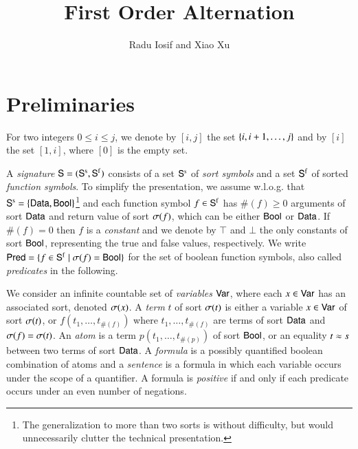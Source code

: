 \documentclass{llncs}
\begin{document}

\title{First Order Alternation}

\author{Radu Iosif and Xiao Xu}

\maketitle

\begin{abstract}
\end{abstract}

\section{Preliminaries}

For two integers $0 \leq i \leq j$, we denote by $[i,j]$ the set
$\{ i,i+1,\ldots,j \}$ and by $[i]$ the set $[1,i]$, where $[0]$ is
the empty set.

A \emph{signature} $\mathsf{S} = (\mathsf{S}^\mathrm{s},\mathsf{S}^\mathrm{f})$ consists of a
set $\mathsf{S}^\mathrm{s}$ of \emph{sort symbols} and a set $\mathsf{S}^\mathrm{f}$ of
sorted \emph{function symbols}. To simplify the presentation, we
assume w.l.o.g. that $\mathsf{S}^\mathrm{s} = \{ \mathsf{Data},\mathsf{Bool} \}$\footnote{The
  generalization to more than two sorts is without difficulty, but
  would unnecessarily clutter the technical presentation.} and each
function symbol $f \in \mathsf{S}^\mathrm{f}$ has $\#(f) \geq 0$ arguments of
sort $\mathsf{Data}$ and return value of sort $\sigma({f})$, which can be either
$\mathsf{Bool}$ or $\mathsf{Data}$. If $\#(f)=0$ then $f$ is a \emph{constant} and we
denote by $\top$ and $\bot$ the only constants of sort $\mathsf{Bool}$,
representing the true and false values, respectively. We write $\mathsf{Pred}
= \{ f \in \mathsf{S}^\mathrm{f} \mid \sigma({f}) = \mathsf{Bool} \}$ for the set of
boolean function symbols, also called \emph{predicates} in the
following.

We consider an infinite countable set of \emph{variables} $\mathsf{Var}$,
where each $x \in \mathsf{Var}$ has an associated sort, denoted $\sigma({x})$. A
\emph{term} $t$ of sort $\sigma({t})$ is either a variable $x \in \mathsf{Var}$
of sort $\sigma({t})$, or $f(t_1,\ldots,t_{\#(f)})$ where
$t_1,\ldots,t_{\#(f)}$ are terms of sort $\mathsf{Data}$ and
$\sigma({f})=\sigma({t})$. An \emph{atom} is a term
$p(t_1,\ldots,t_{\#(p)})$ of sort $\mathsf{Bool}$, or an equality $t \approx s$
between two terms of sort $\mathsf{Data}$. A \emph{formula} is a possibly
quantified boolean combination of atoms and a \emph{sentence} is a
formula in which each variable occurs under the scope of a quantifier.
A formula is \emph{positive} if and only if each predicate occurs
under an even number of negations. 
\end{document}
